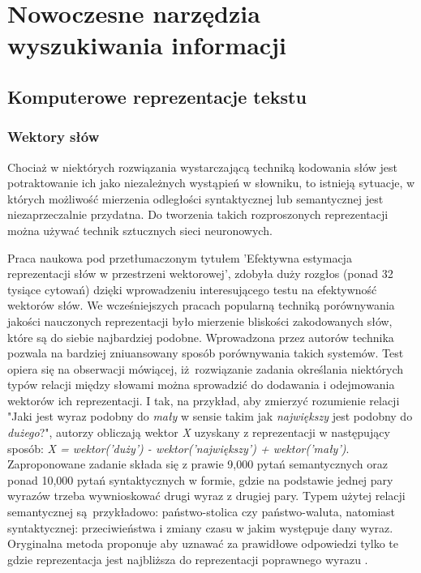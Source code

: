 \chapter{Nowoczesne narzędzia wyszukiwania informacji}
\label{chap:drugi}

\section{Komputerowe reprezentacje tekstu}

\subsection{Wektory słów}

Chociaż w niektórych rozwiązania wystarczającą techniką kodowania słów jest potraktowanie ich jako niezależnych wystąpień w słowniku, to istnieją sytuacje, w których możliwość mierzenia odległości syntaktycznej lub semantycznej jest niezaprzeczalnie przydatna. Do tworzenia takich rozproszonych reprezentacji można używać technik sztucznych sieci neuronowych.\newline

Praca naukowa pod przetłumaczonym tytułem 'Efektywna estymacja reprezentacji słów w przestrzeni wektorowej', zdobyła duży rozgłos (ponad 32 tysiące cytowań) dzięki wprowadzeniu interesującego testu na efektywność wektorów słów. We wcześniejszych pracach popularną techniką porównywania jakości nauczonych reprezentacji było mierzenie bliskości zakodowanych słów, które są do siebie najbardziej podobne. Wprowadzona przez autorów technika pozwala na bardziej zniuansowany sposób porównywania takich systemów. Test opiera się na obserwacji mówiącej, iż rozwiązanie zadania określania niektórych typów relacji między słowami można sprowadzić do dodawania i odejmowania wektorów ich reprezentacji. I tak, na przykład, aby zmierzyć rozumienie relacji "Jaki jest wyraz podobny do \emph{mały} w sensie takim jak \emph{największy} jest podobny do \emph{dużego}?", autorzy obliczają wektor \emph{X} uzyskany z reprezentacji w następujący sposób: \emph{X = wektor('duży') - wektor('największy') + wektor('mały')}. Zaproponowane zadanie składa się z prawie 9,000 pytań semantycznych oraz ponad 10,000 pytań syntaktycznych w formie, gdzie na podstawie jednej pary wyrazów trzeba wywnioskować drugi wyraz z drugiej pary. Typem użytej relacji semantycznej są przykładowo: państwo-stolica czy państwo-waluta, natomiast syntaktycznej: przeciwieństwa i zmiany czasu w jakim występuje dany wyraz. Oryginalna metoda proponuje aby uznawać za prawidłowe odpowiedzi tylko te gdzie reprezentacja jest najbliższa do reprezentacji poprawnego wyrazu \autocite{mikolov2013efficient}.\newline

